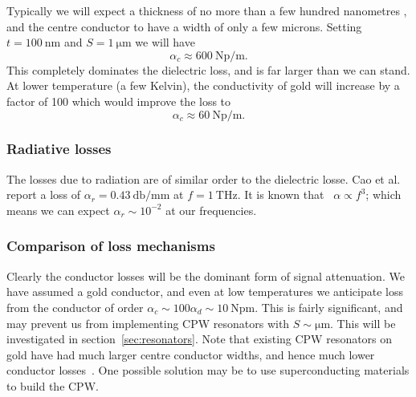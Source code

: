 Typically we will expect a thickness of no more than a few hundred nanometres
,
and the centre conductor to have a width of only a few microns. Setting
$t=\SI{100}{\nano\metre}$ and $S=\SI{1}{\micro\metre}$ we will have
\begin{equation}
  \alpha_c \approx \SI{600}{\neper \per \meter}.
\end{equation}
This completely dominates the dielectric loss, and is far larger than we can
stand. At lower temperature (a few Kelvin), the conductivity of gold will
increase by a factor of 100 which would improve the loss to
\begin{equation}
  \alpha_c \approx \SI{60}{\neper \per \meter}.
\end{equation}


\subsubsection*{Radiative losses}

The losses due to radiation are of similar order to the dielectric losse. Cao et
al.~\cite{L.Cao2013} report a loss of $\alpha_r = \SI{0.43}{\decibel \per \milli
\meter}$ at $f=\SI{1}{\tera\hertz}$. It is known that~\cite{81658} $\alpha
\propto f^3$; which means we can expect $\alpha_r \sim 10^{-2}$  at
our frequencies.

\subsubsection*{Comparison of loss mechanisms}

Clearly the conductor losses will be the dominant form of signal attenuation. We
have assumed a gold conductor, and even at low temperatures we anticipate loss
from the conductor of order $\alpha_c \sim 100 \alpha_d \sim
\SI{10}{\neper\meter}$. This is fairly significant, and may prevent us from
implementing CPW resonators with $S\sim\si{\micro\meter}$. This will be
investigated in section~\ref{sec:resonators}. Note that existing
CPW resonators on gold have had much larger centre conductor widths, and hence
much lower conductor losses~\cite{1127105}. One possible solution may be to use
superconducting materials to build the CPW.

